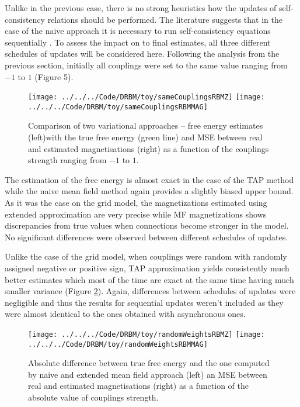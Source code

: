 \documentclass[../report/report.tex]{subfiles}
\begin{document}
Unlike in the previous case, there is no strong heuristics how the updates of self-consistency relations should be performed. The literature suggests that in the case of the naive approach it is necessary to run self-consistency equations sequentially \cite{welling2002new}. To assess the impact on to final estimates, all three different schedules of updates will be considered here. Following the analysis from the previous section, initially all couplings were set to the same value ranging from $-1$ to $1$  (Figure 5).
\begin{figure}[!htb]
%
 \texttt{[image: ../../../Code/DRBM/toy/sameCouplingsRBMZ]}
\endminipage 
{}  
 \texttt{[image: ../../../Code/DRBM/toy/sameCouplingsRBMMAG]}
\endminipage\hfill
\label{fig:rbmSame}
  \caption[1]{Comparison of two  variational approaches -- free energy estimates (left)with the true free energy (green line) and MSE between real and estimated magnetisations (right) as a function of the couplings strength ranging from $-1$ to $1$.}
\end{figure}

The estimation of the free energy is almost exact in the case of the TAP method while the naive mean field method again provides a slightly biased upper bound. As it was the case on the grid model, the magnetizations estimated using extended approximation are very precise while MF magnetizations shows discrepancies from true values when connections become stronger in the model. No significant differences were observed between different schedules of updates.

Unlike the case of the grid model, when couplings were random with randomly assigned negative or positive sign, TAP approximation yields consistently much better estimates  which most of the time are exact at the same time having much smaller variance (Figure \ref{fig:rbmRandom}). Again, differences between schedules of updates were negligible and thus the results for sequential updates weren't included as they were almost identical to the ones obtained with asynchronous ones.
\begin{figure}[!htb]
%
 \texttt{[image: ../../../Code/DRBM/toy/randomWeightsRBMZ]}
\endminipage 
{}  
 \texttt{[image: ../../../Code/DRBM/toy/randomWeightsRBMMAG]}
\endminipage\hfill
  \caption[1]{Absolute difference between true free energy and the one computed by naive and extended mean field approach (left) an MSE between real and estimated magnetisations (right) as a function of the absolute value of couplings strength.}
  \label{fig:rbmRandom}
\end{figure}
\end{document}
